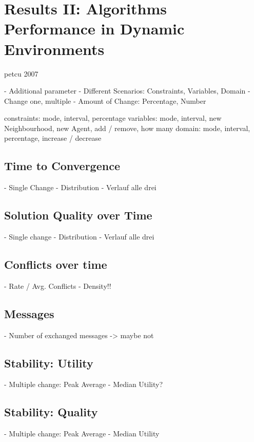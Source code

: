 \section{Results II: Algorithms Performance in Dynamic Environments}

petcu 2007

- Additional parameter
- Different Scenarios: Constraints, Variables, Domain
- Change one, multiple
- Amount of Change: Percentage, Number

constraints: mode, interval, percentage
variables: mode, interval, new Neighbourhood, new Agent, add / remove, how many
domain: mode, interval, percentage, increase / decrease

\subsection{Time to Convergence}
- Single Change
- Distribution
- Verlauf alle drei
\subsection{Solution Quality over Time}
- Single change
- Distribution
- Verlauf alle drei
\subsection{Conflicts over time}
- Rate / Avg. Conflicts - Density!!
\subsection{Messages}
- Number of exchanged messages -> maybe not
\subsection{Stability: Utility}
- Multiple change: Peak Average
- Median Utility?
\subsection{Stability: Quality}
- Multiple change: Peak Average
- Median Utility


